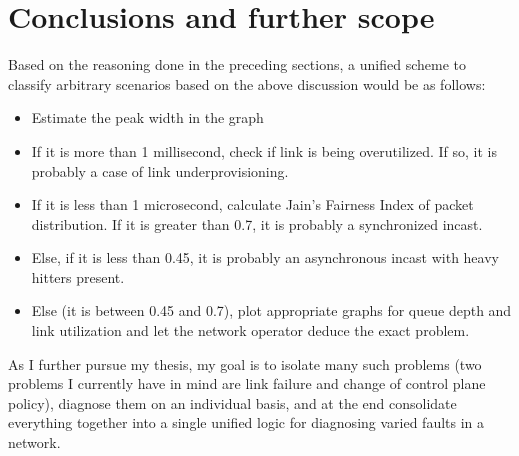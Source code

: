 \section{Conclusions and further scope}

Based on the reasoning done in the preceding sections, a unified scheme to classify arbitrary scenarios based on the above discussion would be as follows:
\begin{itemize}
	\item Estimate the peak width in the graph
	\item If it is more than 1 millisecond, check if link is being overutilized. If so, it is probably a case of link underprovisioning.
	\item If it is less than 1 microsecond, calculate Jain's Fairness Index of packet distribution. If it is greater than 0.7, it is probably a synchronized incast. 
	\item Else, if it is less than 0.45, it is probably an asynchronous incast with heavy hitters present.
	\item Else (it is between 0.45 and 0.7), plot appropriate graphs for queue depth and link utilization and let the network operator deduce the exact problem.
\end{itemize}

As I further pursue my thesis, my goal is to isolate many such problems (two problems I currently have in mind are link failure 
and change of control plane policy), diagnose them on an individual basis, and at the end consolidate everything together into a single unified logic for diagnosing 
varied faults in a network.

